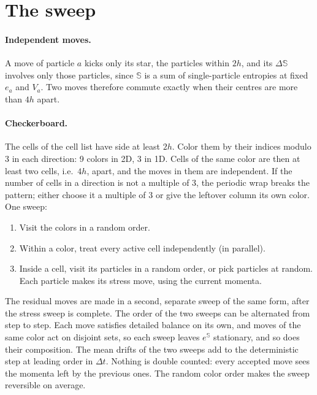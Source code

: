 \documentclass[11pt,aps,preprint,nofootinbib,superscriptaddress,tightenlines]{revtex4-2}
\let\oldparagraph\paragraph
\renewcommand{\paragraph}{\par\bigskip\oldparagraph}
\begin{document}
\section{The sweep}
\label{sec:sweep}

\paragraph{Independent moves.}  A move of particle $a$ kicks only its star,
the particles within $2h$, and its $\Delta\mathbb S$ involves only those
particles, since $\mathbb S$ is a sum of single-particle entropies at fixed $e_a$
and $V_a$.  Two moves therefore commute exactly when their centres are more than
$4h$ apart.

\paragraph{Checkerboard.}  The cells of the cell list have side at least $2h$.
Color them by their indices modulo 3 in each direction: 9 colors in 2D, 3 in
1D.  Cells of the same color are then at least two cells, i.e.\ $4h$, apart,
and the moves in them are independent.  If the number of cells in a direction
is not a multiple of 3, the periodic wrap breaks the pattern; either choose it
a multiple of 3 or give the leftover column its own color.  One sweep:
\begin{enumerate}
\item Visit the colors in a random order.
\item Within a color, treat every active cell independently (in parallel).
\item Inside a cell, visit its particles in a random order, or pick particles
  at random.  Each particle makes its stress move, using the current momenta.
\end{enumerate}
The residual moves are made in a second, separate sweep of the same form, after
the stress sweep is complete.  The order of the two sweeps can be alternated
from step to step.
Each move satisfies detailed balance on its own, and moves of the same color
act on disjoint sets, so each sweep leaves $e^{\mathbb S}$ stationary, and so
does their composition.  The mean drifts of the two sweeps add to the
deterministic step at leading order in $\Delta t$.  Nothing
is double counted: every accepted move sees the momenta left by the previous
ones.  The random color order makes the sweep reversible on average.
\end{document}
